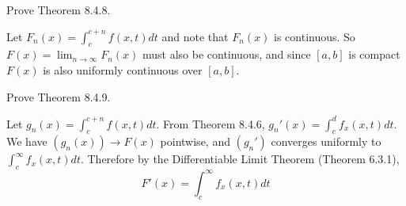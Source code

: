 \begin{exercise}
Prove Theorem 8.4.8.
\end{exercise}
\begin{solution}
Let \(F_n(x) = \int_c^{c+n} f(x,t)dt\) and note that \(F_n(x)\) is continuous. So
\(F(x) = \lim_{n \to \infty} F_n(x)\) must also be continuous, and since \([a,b]\) is compact \(F(x)\) is also uniformly continuous over \([a,b]\).
\end{solution}

\begin{exercise}
    Prove Theorem 8.4.9.
\end{exercise}
\begin{solution}
Let \(g_n(x) = \int_c^{c+n} f(x,t) dt\). From Theorem 8.4.6, \(g_n'(x) = \int_c^d f_x(x,t) dt\). We have \((g_n(x)) \to F(x)\) pointwise, and \((g_n')\) converges uniformly to \(\int_c^\infty f_x(x,t) dt\). Therefore by the Differentiable Limit Theorem (Theorem 6.3.1),
\[F'(x) = \int_c^\infty f_x(x,t) dt\]
\end{solution}

